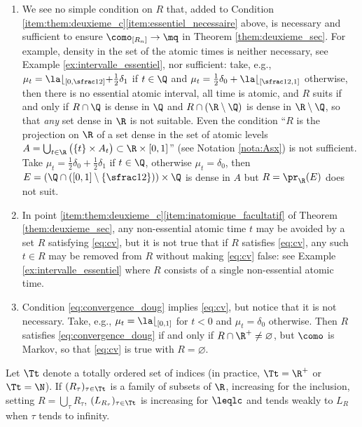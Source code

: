 \skpt
\begin{rem}
\begin{enumerate}
\item
We see no simple condition on $R$ that, added to Condition \eqref{item:them:deuxieme_c}\eqref{item:essentiel_necessaire} above, is necessary and sufficient to ensure $\como_{[R_n]}\to\mq$ in Theorem \ref{them:deuxieme_sec}. For example, density in the set of the atomic times is neither necessary, see Example \ref{ex:intervalle_essentiel}, nor sufficient: take, e.g., $\mu_t=\la\lfloor_{[0,\sfrac12]}+\frac12\delta_1$ if $t\in\Q$ and $\mu_t=\frac12\delta_0+\la\lfloor_{[\sfrac12,1]}$ otherwise, then there is no essential atomic interval, all time is atomic, and $R$ suits if and only if $R\cap\Q$ is dense in $\Q$ and $R\cap(\R\setminus\Q)$ is dense in $\R\setminus\Q$, so that \emph{any}\/ set dense in $\R$ is not suitable. Even the condition ``$R$ is the projection on $\R$ of a set dense in the set of atomic levels $A=\bigcup_{t\in\R}\big(\{t\}\times A_t\bigr)\subset\R\times [0,1]$'' (see Notation \ref{nota:Asx}) is not sufficient. Take $\mu_t=\frac12\delta_0+\frac12\delta_1$ if $t\in\Q$, otherwise $\mu_t=\delta_0$, then $E=(\Q\cap([0,1]\setminus\{\sfrac12\}))\times\Q$ is dense in $A$ but $R=\pr_{\R}(E)$ does not suit.

\item
In point \eqref{item:them:deuxieme_c}\eqref{item:inatomique_facultatif} of Theorem \ref{them:deuxieme_sec}, any non-essential atomic time $t$ may be avoided by a set $R$ satisfying \eqref{eq:cv}, but it is not true that if $R$ satisfies \eqref{eq:cv}, any such $t\in R$ may be removed from $R$ without making \eqref{eq:cv} false: see Example \ref{ex:intervalle_essentiel} where $R$ consists of a single non-essential atomic time.

\item
Condition \eqref{eq:convergence_doug} implies \eqref{eq:cv}, but notice that it is not necessary. Take, e.g., $\mu_t=\la\lfloor_{[0,1]}$ for $t<0$ and $\mu_t=\delta_0$ otherwise. Then $R$ satisfies \eqref{eq:convergence_doug} if and only if $R\cap \R^+\neq\varnothing$, but $\como$ is Markov, so that \eqref{eq:cv} is true with $R=\varnothing$.
\end{enumerate}
\end{rem}

\begin{lem}\label{lem:croissance_lc} Let $\Tt$ denote a totally ordered set of indices (in practice, $\Tt=\R^+$ or $\Tt=\N$). If $(R_\tau)_{\tau\in \Tt}$ is a family of subsets of\/ $\R$, increasing for the inclusion, setting $R=\bigcup_\tau R_\tau$, $(L_{R_\tau})_{\tau\in\Tt}$ is increasing for $\leqlc$ and tends weakly to $L_{R}$ when $\tau$ tends to infinity.
\end{lem}

